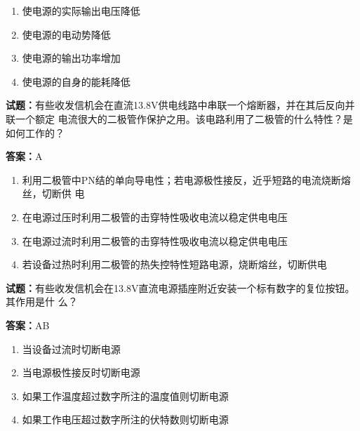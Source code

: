\documentclass{ctexbook}
\begin{document}
\begin{enumerate}[leftmargin=3em]
  \item 使电源的实际输出电压降低 

  \item 使电源的电动势降低 

  \item 使电源的输出功率增加 

  \item 使电源的自身的能耗降低 

\end{enumerate}





\vspace{1em}

\textbf{试题：}有些收发信机会在直流13.8V供电线路中串联一个熔断器，并在其后反向并联一个额定
电流很大的二极管作保护之用。该电路利用了二极管的什么特性？是如何工作的？ 

\textbf{答案：}A 

\begin{enumerate}[leftmargin=3em]
  \item 利用二极管中PN结的单向导电性；若电源极性接反，近乎短路的电流烧断熔丝，切断供
电 

  \item 在电源过压时利用二极管的击穿特性吸收电流以稳定供电电压 

  \item 在电源过流时利用二极管的击穿特性吸收电流以稳定供电电压 

  \item 若设备过热时利用二极管的热失控特性短路电源，烧断熔丝，切断供电 

\end{enumerate}





\vspace{1em}

\textbf{试题：}有些收发信机会在13.8V直流电源插座附近安装一个标有数字的复位按钮。其作用是什
么？ 

\textbf{答案：}AB 

\begin{enumerate}[leftmargin=3em]
  \item 当设备过流时切断电源 

  \item 当电源极性接反时切断电源 

  \item 如果工作温度超过数字所注的温度值则切断电源 

  \item 如果工作电压超过数字所注的伏特数则切断电源 

\end{enumerate}
\end{document}
